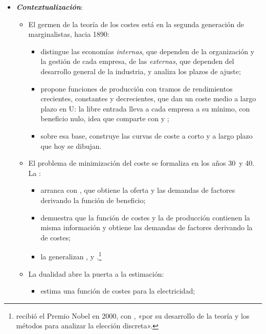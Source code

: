 \documentclass[11pt]{article}
\begin{document}
\begin{itemize}
\item \textbf{\emph{Contextualización}}:
  \begin{itemize}
  \item El germen de la teoría de los costes está en la segunda generación de marginalistas, hacia 1890:
    \begin{itemize}
    \item \textcite{Marshall1890Principles} distingue las economías \emph{internas}, que dependen de la organización y la gestión de cada empresa, de las \emph{externas}, que dependen del desarrollo general de la industria, y analiza los plazos de ajuste;
    \item {} propone funciones de producción con tramos de rendimientos crecientes, constantes y decrecientes, que dan un coste medio a largo plazo en U: la libre entrada lleva a cada empresa a su mínimo, con beneficio nulo, idea que comparte con  y \nocite{Wicksell1901Forelasningar,Humphrey1997Algebraic};
    \item sobre esa base, \textcite{Viner1931Cost} construye las curvas de coste a corto y a largo plazo que hoy se dibujan.
    \end{itemize}
  \item El problema de minimización del coste se formaliza en los años 30~y 40\nocite{Viner1931Cost,Hicks1939Value,Samuelson1947Foundations}. La :
    \begin{itemize}
    \item arranca con \textcite{Hotelling1932Edgeworth}, que obtiene la oferta y las demandas de factores derivando la función de beneficio;
    \item \textcite{Shephard1953Cost} demuestra que la función de costes y la de producción contienen la misma información y obtiene las demandas de factores derivando la de costes;
    \item la generalizan \textcite{Uzawa1964Duality}, \textcite{Diewert1971Application,Diewert1974Applications} y \textcite{McFadden1978Cost}.\footnote{ recibió el Premio Nobel en 2000, con , «por su desarrollo de la teoría y los métodos para analizar la elección discreta»\nocite{Nobel2000HeckmanMcFadden}.}
    \end{itemize}
  \item La dualidad abre la puerta a la estimación:
    \begin{itemize}
    \item \textcite{Nerlove1963Returns} estima una función de costes para la electricidad;

\end{itemize}
\end{itemize}
\end{itemize}
\end{document}
